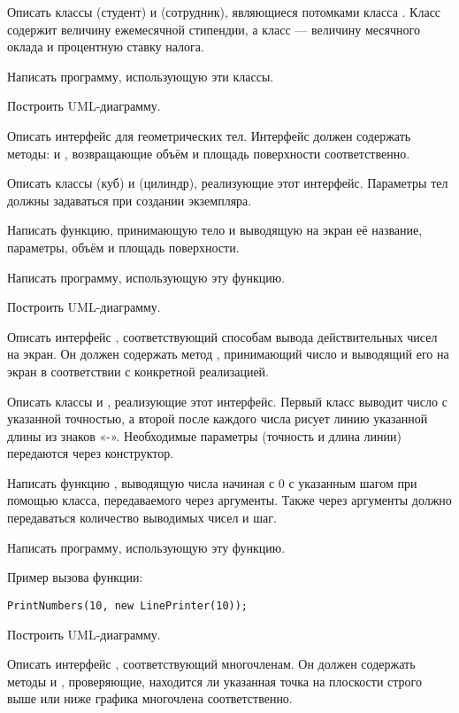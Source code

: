 Описать классы  (студент) и  (сотрудник),
являющиеся потомками класса . Класс  содержит
величину ежемесячной стипендии, а класс  — величину
месячного оклада и процентную ставку налога.

Написать программу, использующую эти классы.

Построить UML-диаграмму.

\task Описать интерфейс  для геометрических тел. Интерфейс
должен содержать методы:  и ,
возвращающие объём и площадь поверхности соответственно.

Описать классы  (куб) и  (цилиндр),
реализующие этот интерфейс. Параметры тел должны задаваться при
создании экземпляра.

Написать функцию, принимающую тело и выводящую на экран её название,
параметры, объём и площадь поверхности.

Написать программу, использующую эту функцию.

Построить UML-диаграмму.

\task Описать интерфейс , соответствующий способам
вывода действительных чисел на экран. Он должен содержать метод
, принимающий число и выводящий его на экран в соответствии
с конкретной реализацией.

Описать классы  и , реализующие
этот интерфейс. Первый класс выводит число с указанной точностью, а
второй после каждого числа рисует линию указанной длины из знаков
«-». Необходимые параметры (точность и длина линии) передаются через
конструктор.

Написать функцию , выводящую числа начиная с 0 с
указанным шагом при помощью класса, передаваемого через
аргументы. Также через аргументы должно передаваться количество
выводимых чисел и шаг.

Написать программу, использующую эту функцию.

Пример вызова функции:
\begin{lstlisting}[numbers=none]
PrintNumbers(10, new LinePrinter(10));
\end{lstlisting}

Построить UML-диаграмму.

\task Описать интерфейс , соответствующий
многочленам. Он должен содержать методы  и ,
проверяющие, находится ли указанная точка на плоскости строго выше или
ниже графика многочлена соответственно.

